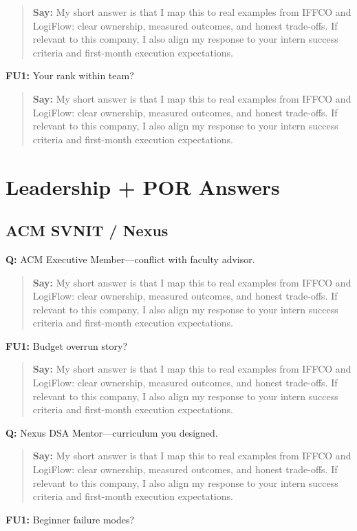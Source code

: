 \documentclass[9pt,a4paper]{article}
\begin{document}
\begin{quote}\small\textbf{Say:} My short answer is that I map this to real examples from IFFCO and LogiFlow: clear ownership, measured outcomes, and honest trade-offs. If relevant to this company, I also align my response to your intern success criteria and first-month execution expectations.\end{quote}
\vspace{2mm}
\textbf{FU1:} Your rank within team?

\begin{quote}\small\textbf{Say:} My short answer is that I map this to real examples from IFFCO and LogiFlow: clear ownership, measured outcomes, and honest trade-offs. If relevant to this company, I also align my response to your intern success criteria and first-month execution expectations.\end{quote}
\vspace{2mm}
\section{Leadership + POR Answers}
\subsection{ACM SVNIT / Nexus}
\textbf{Q:} ACM Executive Member---conflict with faculty advisor.

\begin{quote}\small\textbf{Say:} My short answer is that I map this to real examples from IFFCO and LogiFlow: clear ownership, measured outcomes, and honest trade-offs. If relevant to this company, I also align my response to your intern success criteria and first-month execution expectations.\end{quote}
\vspace{2mm}
\textbf{FU1:} Budget overrun story?

\begin{quote}\small\textbf{Say:} My short answer is that I map this to real examples from IFFCO and LogiFlow: clear ownership, measured outcomes, and honest trade-offs. If relevant to this company, I also align my response to your intern success criteria and first-month execution expectations.\end{quote}
\vspace{2mm}
\textbf{Q:} Nexus DSA Mentor---curriculum you designed.

\begin{quote}\small\textbf{Say:} My short answer is that I map this to real examples from IFFCO and LogiFlow: clear ownership, measured outcomes, and honest trade-offs. If relevant to this company, I also align my response to your intern success criteria and first-month execution expectations.\end{quote}
\vspace{2mm}
\textbf{FU1:} Beginner failure modes?
\end{document}
